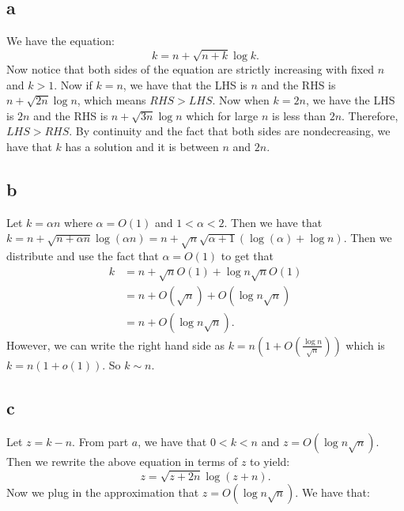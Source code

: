 \documentclass[]{article}
\begin{document}
\subsection{a}
We have the equation:
\begin{equation}
	k = n + \sqrt{n + k} \log k.
\end{equation}
Now notice that both sides of the equation are strictly increasing with fixed $n$ and $k > 1$. Now if $k = n$, we have that the LHS is $n$ and the RHS is $n + \sqrt{2n} \log n$, which means $RHS > LHS$. Now when $k = 2n$, we have the LHS is $2n$ and the RHS is $n + \sqrt{3n} \log n$ which for large $n$ is less than $2n$. Therefore, $LHS > RHS$. By continuity and the fact that both sides are nondecreasing, we have that $k$ has a solution and it is between $n$ and $2n$. 
\subsection{b}
Let $k = \alpha n$ where $\alpha = O(1)$ and $1 < \alpha < 2$. 
Then we have that 
$k = n + \sqrt{n + \alpha n} \log (\alpha n) = n + \sqrt{n} \sqrt{\alpha + 1} (\log(\alpha) + \log n)$. Then we distribute and use the fact that $\alpha = O(1)$ to get that
\begin{align*}
	k &= n + \sqrt{n} O(1) + \log n \sqrt{n} O(1)\\
	 &= n + O(\sqrt{n}) + O(\log n \sqrt{n})\\
	 &= n + O(\log n \sqrt n).
\end{align*}
However, we can write the right hand side as $k = n(1 + O(\frac{\log n}{\sqrt{n}}))$ which is $k = n(1 + o(1))$. So $k \sim n$. 
\subsection{c}
Let $z = k - n$. From part $a$, we have that $0 < k < n$ and $z =  O(\log n \sqrt n)$. Then we rewrite the above equation in terms of $z$ to yield:
\begin{equation}
	z = \sqrt{z + 2n} \log (z + n).
\end{equation}
Now we plug in the approximation that $z = O(\log n \sqrt{n})$. We have that:
\end{document}
